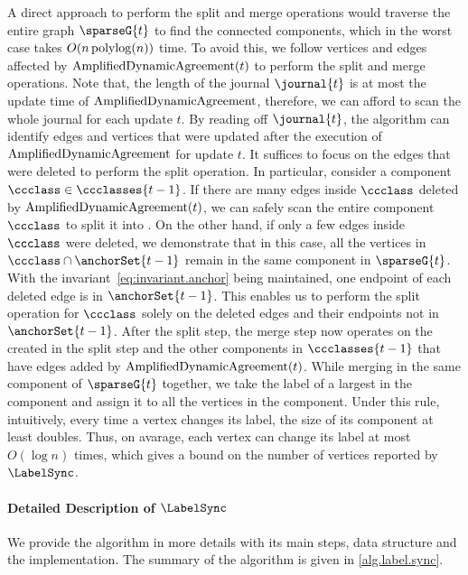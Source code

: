 A direct approach to perform the split and merge operations would traverse the entire graph $ \sparseG{t} $ to find the connected components, which in the worst case takes $ O(n\operatorname{polylog}(n)) $ time.
To avoid this, we follow vertices and edges affected by $ \mathrm{AmplifiedDynamicAgreement}(t) $ to perform the split and merge operations.
Note that, the length of the journal $ \journal{t} $ is at most the update time of $ \mathrm{AmplifiedDynamicAgreement} $, therefore, we can afford to scan the whole journal for each update $ t $.
By reading off $ \journal{t} $, the algorithm can identify edges and vertices that were updated after the execution of $ \mathrm{AmplifiedDynamicAgreement} $ for update $ t $.
It suffices to focus on the edges that were deleted to perform the split operation.
In particular, consider a component $ \ccclass \in \ccclasses{t-1} $.
If there are many edges inside $ \ccclass $ deleted by $ \mathrm{AmplifiedDynamicAgreement}(t) $, we can safely scan the entire component $ \ccclass $ to split it into .
On the other hand, if only a few edges inside $ \ccclass $ were deleted, we demonstrate that in this case, all the vertices in $ \ccclass \cap \anchorSet{t-1} $ remain in the same component in $ \sparseG{t} $.
With the invariant~\eqref{eq:invariant.anchor} being maintained, one endpoint of each deleted edge is in $ \anchorSet{t-1} $.
This enables us to perform the split operation for $ \ccclass $ solely on the deleted edges and their endpoints not in $ \anchorSet{t-1} $.
After the split step, the merge step now operates on the  created in the split step and the other components in $ \ccclasses{t-1} $ that have edges added by $ \mathrm{AmplifiedDynamicAgreement}(t) $.
While merging  in the same component of $ \sparseG{t} $ together, we take the label of a largest \piece{} in the component and assign it to all the vertices in the component.
Under this rule, intuitively, every time a vertex changes its label, the size of its component at least doubles.
Thus, on avarage, each vertex can change its label at most $ O(\log n) $ times, which gives a bound on the number of vertices reported by $ \LabelSync $.


\paragraph{Detailed Description of \texorpdfstring{$ \LabelSync $}{LabelSync}}\label{par:detailed_description_of_labelsync_} %
We provide the algorithm in more details with its main steps, data structure and the implementation.
The summary of the algorithm is given in \cref{alg.label.sync}.

